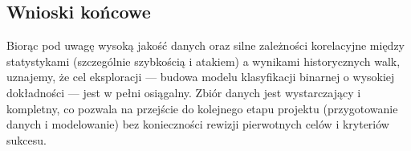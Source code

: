 \documentclass[12pt, a4paper]{report}
\begin{document}
\subsection{Wnioski końcowe}
Biorąc pod uwagę wysoką jakość danych oraz silne zależności korelacyjne między statystykami (szczególnie szybkością i atakiem) a wynikami historycznych walk, uznajemy, że cel eksploracji — budowa modelu klasyfikacji binarnej o wysokiej dokładności — jest w pełni osiągalny. Zbiór danych jest wystarczający i kompletny, co pozwala na przejście do kolejnego etapu projektu (przygotowanie danych i modelowanie) bez konieczności rewizji pierwotnych celów i kryteriów sukcesu.
\newpage
{}

\end{document}
